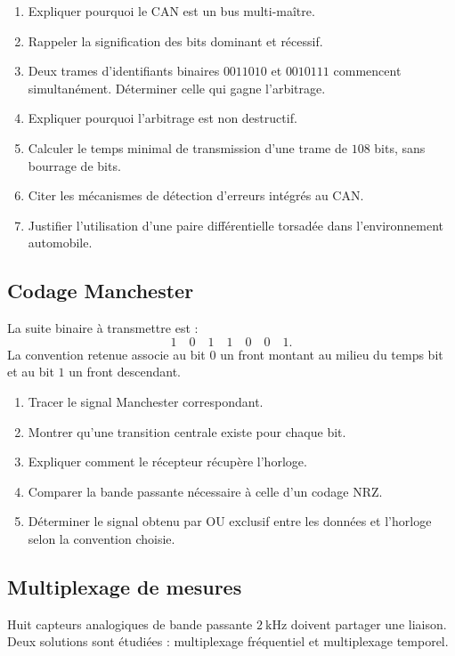 \begin{enumerate}
  \item Expliquer pourquoi le CAN est un bus multi-maître.
  \item Rappeler la signification des bits dominant et récessif.
  \item Deux trames d'identifiants binaires $0011010$ et $0010111$ commencent simultanément. Déterminer celle qui gagne l'arbitrage.
  \item Expliquer pourquoi l'arbitrage est non destructif.
  \item Calculer le temps minimal de transmission d'une trame de $108$ bits, sans bourrage de bits.
  \item Citer les mécanismes de détection d'erreurs intégrés au CAN.
  \item Justifier l'utilisation d'une paire différentielle torsadée dans l'environnement automobile.
\end{enumerate}

\subsection{Codage Manchester}

La suite binaire à transmettre est :
\[
1\quad0\quad1\quad1\quad0\quad0\quad1.
\]
La convention retenue associe au bit $0$ un front montant au milieu du temps bit et au bit $1$ un front descendant.

\begin{enumerate}
  \item Tracer le signal Manchester correspondant.
  \item Montrer qu'une transition centrale existe pour chaque bit.
  \item Expliquer comment le récepteur récupère l'horloge.
  \item Comparer la bande passante nécessaire à celle d'un codage NRZ.
  \item Déterminer le signal obtenu par OU exclusif entre les données et l'horloge selon la convention choisie.
\end{enumerate}

\subsection{Multiplexage de mesures}

Huit capteurs analogiques de bande passante $2\ \mathrm{kHz}$ doivent partager une liaison. Deux solutions sont étudiées : multiplexage fréquentiel et multiplexage temporel.

